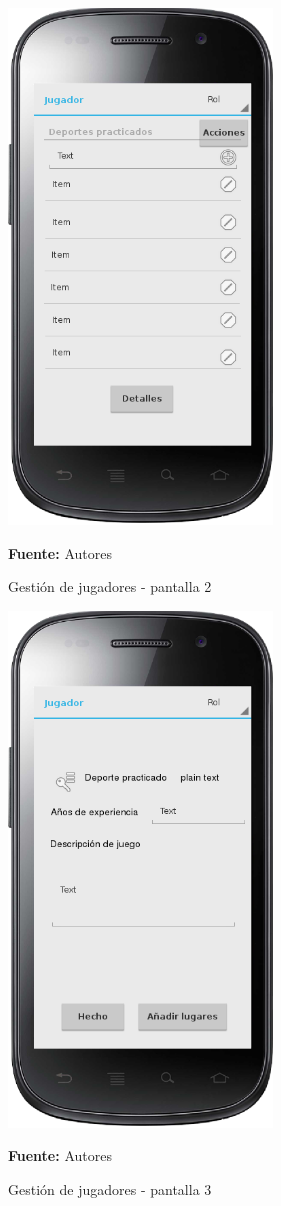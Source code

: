 \begin{figure}[!htb]
  \begin{center}
    \includegraphics[width=7cm]{./imagenes/UI/Jugador/gestion_jugador_2.png}
    \caption{Gestión de jugadores - pantalla 2}
    \label{fig:gestion_jugador_2}
    \textbf{Fuente:}  Autores
  \end{center}
\end{figure}

\begin{figure}[!htb]
  \begin{center}
    \includegraphics[width=7cm]{./imagenes/UI/Jugador/gestion_jugador_3.png}
    \caption{Gestión de jugadores - pantalla 3}
    \label{fig:gestion_jugador_3}
    \textbf{Fuente:}  Autores
  \end{center}
\end{figure}